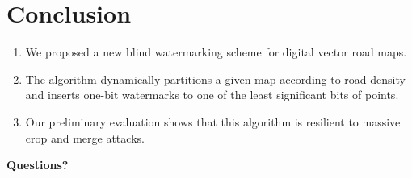 \documentclass[
	paper=128mm:96mm,	%
	fontsize=11pt,					%
	pagesize,							%
	parskip=half-,					%
	numbers=noendperiod,	%
	captions=nooneline			%
	]{scrartcl}							%
\theoremstyle{mythmstyle}
\begin{document}
\clearpage
\section{Conclusion}
\begin{enumerate}
		\item We proposed a new blind watermarking scheme for digital vector road maps. 
\item The algorithm dynamically partitions a given map according to
road density and inserts one-bit watermarks to one of the least significant bits
of points. 
\item Our preliminary evaluation shows that this algorithm 
is resilient to massive crop and merge attacks.
\end{enumerate}
\clearpage


\thispagestyle{empty} %




\clearpage
%
%
\thispagestyle{empty}
%
\begin{flushright}
	\vspace{0.6cm}
	\color{white}\sffamily
	{\bfseries\Large
	Questions?	
	\par}
	\vfill
\end{flushright}
\end{document}
